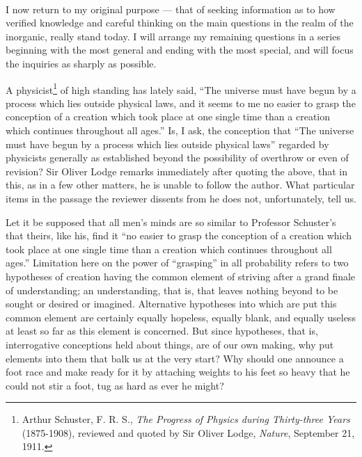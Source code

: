 \documentclass[a4paper, 11pt, oneside, polutonikogreek, english]{article}
\begin{document}
\paragraph{}
I now return to my original purpose --- that of seeking information as to how verified knowledge and careful thinking on the main questions in the realm of the inorganic, really stand today. I will arrange my remaining questions in a series beginning with the most general and ending with the most special, and will focus the inquiries as sharply as possible.

A physicist\footnote{Arthur Schuster, F. R. S., \emph{The Progress of Physics during Thirty-three Years} (1875-1908), reviewed and quoted by Sir Oliver Lodge, \emph{Nature}, September 21, 1911.} of high standing has lately said, ``The universe must have begun by a process which lies outside physical laws, and it seems to me no easier to grasp the conception of a creation which took place at one single time than a creation which continues throughout all ages.'' Is, I ask, the conception that ``The universe must have begun by a process which lies outside physical laws'' regarded by physicists generally as established beyond the possibility of overthrow or even of revision? Sir Oliver Lodge remarks immediately after quoting the above, that in this, as in a few other matters, he is unable to follow the author. What particular items in the passage the reviewer dissents from he does not, unfortunately, tell us.

Let it be supposed that all men's minds are so similar to Professor Schuster's that theirs, like his, find it ``no easier to grasp the conception of a creation which took place at one single time than a creation which continues throughout all ages.'' Limitation here on the power of ``grasping'' in all probability refers to two hypotheses of creation having the common element of striving after a grand finale of understanding; an understanding, that is, that leaves nothing beyond to be sought or desired or imagined. Alternative hypotheses into which are put this common element are certainly equally hopeless, equally blank, and equally useless at least so far as this element is concerned. But since hypotheses, that is, interrogative conceptions held about things, are of our own making, why put elements into them that balk us at the very start? Why should one announce a foot race and make ready for it by attaching weights to his feet so heavy that he could not stir a foot, tug as hard as ever he might?
\end{document}
